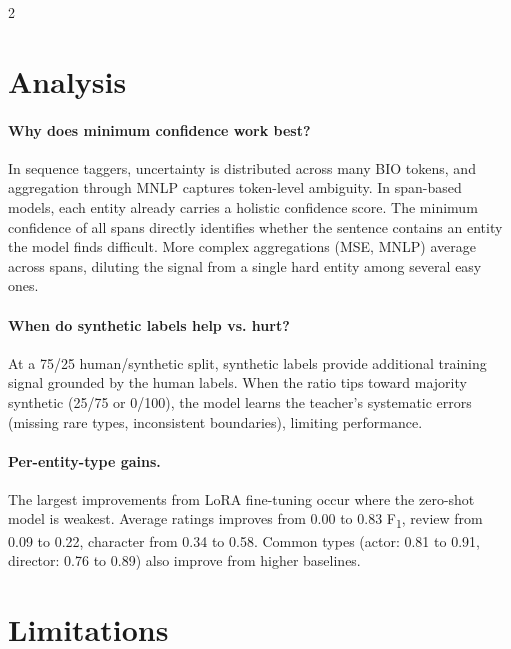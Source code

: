 \documentclass[11pt]{article}
\newcommand{\fone}{F\textsubscript{1}}
\begin{document}
\begin{multicols}{2}

\section{Analysis}

\paragraph{Why does minimum confidence work best?}
In sequence taggers, uncertainty is distributed across many BIO tokens, and aggregation through MNLP captures token-level ambiguity. In span-based models, each entity already carries a holistic confidence score. The minimum confidence of all spans directly identifies whether the sentence contains an entity the model finds difficult. More complex aggregations (MSE, MNLP) average across spans, diluting the signal from a single hard entity among several easy ones.

\paragraph{When do synthetic labels help vs. hurt?}
At a 75/25 human/synthetic split, synthetic labels provide additional training signal grounded by the human labels. When the ratio tips toward majority synthetic (25/75 or 0/100), the model learns the teacher's systematic errors (missing rare types, inconsistent boundaries), limiting performance.

\paragraph{Per-entity-type gains.}
The largest improvements from LoRA fine-tuning occur where the zero-shot model is weakest. Average ratings improves from 0.00 to 0.83 \fone{}, review from 0.09 to 0.22, character from 0.34 to 0.58. Common types (actor: 0.81 to 0.91, director: 0.76 to 0.89) also improve from higher baselines.

\section{Limitations}


\end{multicols}
\end{document}
